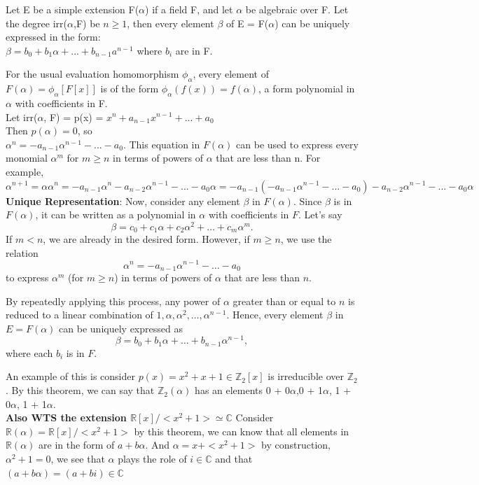 \documentclass{article}
\newcommand\R{\ensuremath{\mathbb{R}}}
\newcommand\Z{\ensuremath{\mathbb{Z}}}
\newcommand\C{\ensuremath{\mathbb{C}}}
\begin{document}
\begin{theorem}
    Let E be a simple extension F($\alpha$) if a field F, and let $\alpha$ be algebraic over F. Let the degree irr($\alpha$,F) be $n\geq 1$, then every element $\beta$ of E = F($\alpha$) can be uniquely expressed in the form:
    \\ $\beta = b_0+b_1\alpha + ... + b_{n-1}a^{n-1}$ where $b_i$ are in F.
\end{theorem}
\begin{Proof}
    For the usual evaluation homomorphism $\phi_\alpha$, every element of $F(\alpha) = \phi_\alpha[F[x]]$ is of the form $\phi_\alpha(f(x)) = f(\alpha)$, a form polynomial in $\alpha$ with coefficients in F. 
    \\Let  irr($\alpha$, F) = p(x) = $x^n + a_{n-1}x^{n-1} + ... + a_0$
    \\ Then $p(\alpha) = 0$, so 
\\$\alpha^n = -a_{n-1} \alpha ^{n-1}-...-a_0$. This equation in $F(\alpha)$ can be used to express every monomial $\alpha ^m$ for $m \geq n$ in terms of powers of $\alpha$ that are less than n. For example, $\alpha^{n+1} = \alpha \alpha^n = -a_{n-1}\alpha^n - a_{n-2}\alpha^{n-1} - ... - a_0\alpha = -a_{n-1}(-a_{n-1}\alpha^{n-1} - ... - a_0)-a_{n-2}\alpha^{n-1} - ... - a_0\alpha$
\\
\textbf{Unique Representation}: Now, consider any element \(\beta\) in \(F(\alpha)\). Since \(\beta\) is in \(F(\alpha)\), it can be written as a polynomial in \(\alpha\) with coefficients in \(F\). Let's say 
\[
\beta = c_0 + c_1\alpha + c_2\alpha^2 + \ldots + c_m\alpha^m.
\]
If \(m < n\), we are already in the desired form. However, if \(m \geq n\), we use the relation 
\[
\alpha^n = -a_{n-1}\alpha^{n-1} - \ldots - a_0
\]
to express \(\alpha^m\) (for \(m \geq n\)) in terms of powers of \(\alpha\) that are less than \(n\).

By repeatedly applying this process, any power of \(\alpha\) greater than or equal to \(n\) is reduced to a linear combination of \(1, \alpha, \alpha^2, \ldots, \alpha^{n-1}\). Hence, every element \(\beta\) in \(E = F(\alpha)\) can be uniquely expressed as 
\[
\beta = b_0 + b_1\alpha + \ldots + b_{n-1}\alpha^{n-1},
\]
where each \(b_i\) is in \(F\).

\end{Proof}
\begin{Example}
    An example of this is consider $p(x) = x^2 + x + 1 \in \Z_2[x]$ is irreducible over $\Z_2$. By this theorem, we can say that $\Z_2(\alpha)$ has an elements 0 + 0$\alpha$,0 + 1$\alpha$, 1 + 0$\alpha$, 1 + 1$\alpha$.
\\ \textbf{Also WTS the extension $\R[x]/ <x^2+1> \simeq \C$ } Consider $\R(\alpha) = \R[x]/<x^2+1>$ by this theorem, we can know that all elements in $\R(\alpha)$ are in the form of $a + b\alpha$. And $\alpha = x + <x^2+1>$ by construction, $\alpha^2 + 1 = 0$, we see that $\alpha $ plays the role of $i\in \C $ and that $(a+b \alpha) = (a+bi) \in \C$
\end{Example}
\newpage
\end{document}
